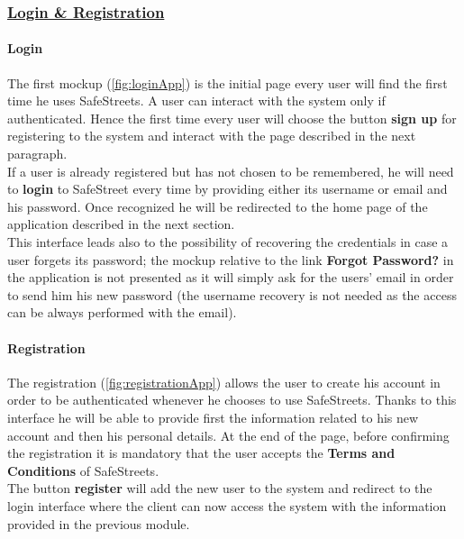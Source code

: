 		\subsubsection[Login \& Registration]{\hyperlink{toc}{Login \& Registration}}
			\label{sec:userLoginRegistration}
			
			\paragraph{Login}
				The first mockup (\autoref{fig:loginApp}) is the initial page every user will find the first time he uses SafeStreets. A user can interact with the system only if authenticated. Hence the first time every user will choose the button \textbf{sign up} for registering to the system and interact with the page described in the next paragraph.\\
				
				If a user is already registered but has not chosen to be remembered, he will need to \textbf{login} to SafeStreet every time by providing either its username or email and his password. Once recognized he will be redirected to the home page of the application described in the next section.\\
				
				This interface leads also to the possibility of recovering the credentials in case a user forgets its password; the mockup relative to the link \textbf{Forgot Password?} in the application is not presented as it will simply ask for the users' email in order to send him his new password (the username recovery is not needed as the access can be always performed with the email).
				
			\paragraph{Registration}
				The registration (\autoref{fig:registrationApp}) allows the user to create his account in order to be authenticated whenever he chooses to use SafeStreets. Thanks to this interface he will be able to provide first the information related to his new account and then his personal details. At the end of the page, before confirming the registration it is mandatory that the user accepts the \textbf{Terms and Conditions} of SafeStreets.\\
				
				The button \textbf{register} will add the new user to the system and redirect to the login interface where the client can now access the system with the information provided in the previous module.
				
